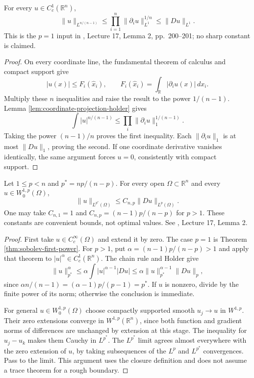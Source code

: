 \begin{theorem}\label{thm:sobolev-first-power}
For every $u\in C_c^1(\mathbb R^n)$,
\[
 \|u\|_{L^{n/(n-1)}}
 \leq\prod_{i=1}^n\|\partial_i u\|_{L^1}^{1/n}
 \leq\|Du\|_{L^1}.
\]
This is the $p=1$ input in \cite{SimonPDE}, Lecture 17, Lemma 2, pp.~200--201; no sharp constant is claimed.
\end{theorem}
\begin{proof}
On every coordinate line, the fundamental theorem of calculus and compact support give
\[
 |u(x)|\leq F_i(\widehat x_i),\qquad
 F_i(\widehat x_i)=\int_{\mathbb R}|\partial_i u(x)|\,dx_i.
\]
Multiply these $n$ inequalities and raise the result to the power $1/(n-1)$. Lemma \ref{lem:coordinate-projection-holder} gives
\[
 \int |u|^{n/(n-1)}\leq\prod_i\|\partial_i u\|_1^{1/(n-1)}.
\]
Taking the power $(n-1)/n$ proves the first inequality. Each $\|\partial_i u\|_1$ is at most $\|Du\|_1$, proving the second. If one coordinate derivative vanishes identically, the same argument forces $u=0$, consistently with compact support.
\end{proof}

\begin{theorem}\label{thm:euclidean-sobolev-gain}
Let $1\leq p<n$ and $p^*=np/(n-p)$. For every open $\Omega\subset\mathbb R^n$ and every $u\in W^{1,p}_0(\Omega)$,
\[
 \|u\|_{L^{p^*}(\Omega)}\leq C_{n,p}\|Du\|_{L^p(\Omega)}.
\]
One may take $C_{n,1}=1$ and $C_{n,p}=(n-1)p/(n-p)$ for $p>1$. These constants are convenient bounds, not optimal values. See \cite{SimonPDE}, Lecture 17, Lemma 2.
\end{theorem}
\begin{proof}
First take $u\in C_c^\infty(\Omega)$ and extend it by zero. The case $p=1$ is Theorem \ref{thm:sobolev-first-power}. For $p>1$, put $\alpha=(n-1)p/(n-p)>1$ and apply that theorem to $|u|^\alpha\in C_c^1(\mathbb R^n)$. The chain rule and Holder give
\[
 \|u\|_{p^*}^{\alpha}
 \leq\alpha\int |u|^{\alpha-1}|Du|
 \leq\alpha\|u\|_{p^*}^{\alpha-1}\|Du\|_p,
\]
since $\alpha n/(n-1)=(\alpha-1)p/(p-1)=p^*$. If $u$ is nonzero, divide by the finite power of its norm; otherwise the conclusion is immediate.

For general $u\in W^{1,p}_0(\Omega)$ choose compactly supported smooth $u_j\to u$ in $W^{1,p}$. Their zero extensions converge in $W^{1,p}(\mathbb R^n)$, since both function and gradient norms of differences are unchanged by extension at this stage. The inequality for $u_j-u_k$ makes them Cauchy in $L^{p^*}$. The $L^{p^*}$ limit agrees almost everywhere with the zero extension of $u$, by taking subsequences of the $L^p$ and $L^{p^*}$ convergences. Pass to the limit. This argument uses the closure definition and does not assume a trace theorem for a rough boundary.
\end{proof}

